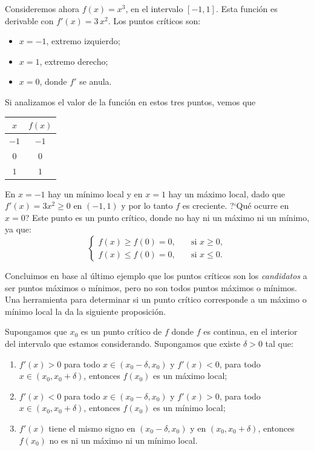\begin{example}
    Consideremos ahora $f(x)=x^3$, en el intervalo $[-1,1]$. Esta función es derivable con $f'(x)=3\, x^2$. Los puntos críticos son:
    \begin{itemize}
        \item $x=-1$, extremo izquierdo;
        \item $x=1$, extremo derecho;
        \item $x=0$, donde $f'$ se anula.
    \end{itemize}
    Si analizamos el valor de la función en estos tres puntos, vemos que
    
    \begin{center}
        \begin{tabular}{|c|c|}
            \hline
            $x$ & $f(x)$ \\
            \hline 
            $-1$ & $-1$ \\
            $0$ & $0$ \\
            $1$ & $1$ \\
            \hline
        \end{tabular}
    \end{center}
    En $x=-1$ hay un mínimo local y en $x=1$ hay un máximo local, dado que $f'(x)=3 x^2\ge 0$ en $(-1,1)$ y por lo tanto $f$ es creciente. ?`Qué ocurre en $x=0$? Este punto es un punto crítico, donde no hay ni un máximo ni un mínimo, ya que:
    \[
    \begin{cases}
        f(x) \ge f(0)=0,\quad&\text{si $x\ge 0$},
        \\
        f(x) \le f(0)=0,\quad&\text{si $x\le 0$}.
    \end{cases}\]
\end{example}

Concluimos en base al último ejemplo que los puntos críticos son los \emph{candidatos} a ser puntos máximos o mínimos, pero no son todos puntos máximos o mínimos. Una herramienta para determinar si un punto crítico corresponde a un máximo o mínimo local la da la siguiente proposición.

\begin{proposition}
    Supongamos que $x_0$ es un punto crítico de $f$ donde $f$ es continua, en el interior del intervalo que estamos considerando. Supongamos que existe $\delta>0$ tal que:
    \begin{enumerate}
        \item $f'(x)>0$ para todo $x\in(x_0-\delta,x_0)$ y $f'(x)<0$, para todo $x\in(x_0,x_0+\delta)$, entonces $f(x_0)$ es un máximo local; 
        \item $f'(x)<0$ para todo $x\in(x_0-\delta,x_0)$ y $f'(x)>0$, para todo $x\in(x_0,x_0+\delta)$, entonces $f(x_0)$ es un mínimo local; 
        \item $f'(x)$ tiene el mismo signo en $(x_0-\delta,x_0)$ y en $(x_0,x_0+\delta)$, entonces $f(x_0)$ no es ni un máximo ni un mínimo local.
    \end{enumerate}
\end{proposition}

